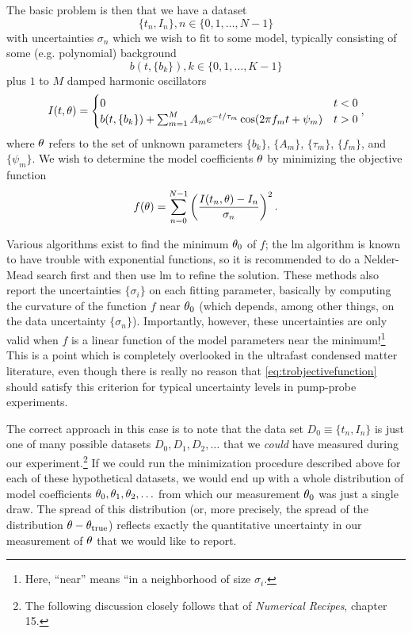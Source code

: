The basic problem is then that we have a dataset 
\begin{equation}
\{t_n, I_n\}, n\in \{0, 1, \ldots, N-1\}
\end{equation}
with uncertainties $\sigma_n$ which we wish to fit to some model, typically consisting of some (e.g. polynomial) background
\begin{equation}
b(t, \{b_k\}), k\in\{0, 1, \ldots, K-1\}
\end{equation}
plus $1$ to $M$ damped harmonic oscillators
\begin{equation}
I(t, \theta) = \begin{cases}
0 & t<0\\
b(t, \{b_k\})+\sum_{m=1}^M A_m e^{-t/\tau_m} \cos (2\pi f_m t + \psi_m) & t>0
\end{cases},
\end{equation}
where $\theta$ refers to the set of unknown parameters $\{b_k\}$, $\{A_m\}$, $\{\tau_m\}$, $\{f_m\}$, and $\{\psi_m\}$.
We wish to determine the model coefficients $\theta$ by minimizing the objective function
\begin{equation}\label{eq:trobjectivefunction}
f(\theta) = \sum_{n=0}^{N-1}\left(\frac{I(t_n, \theta)-I_n}{\sigma_n}\right)^2.
\end{equation}

Various algorithms exist to find the minimum $\theta_0$ of $f$; the \gls{lm} algorithm \citep{levenberg_method_1944,marquardt_algorithm_1963} is known to have trouble with exponential functions, so it is recommended to do a Nelder-Mead search \citep{nelder_simplex_1965} first and then use \gls{lm} to refine the solution.
These methods also report the uncertainties $\{\sigma_i\}$ on each fitting parameter, basically by computing the curvature of the function $f$ near $\theta_0$ (which depends, among other things, on the data uncertainty $\{\sigma_n\}$).
Importantly, however, these uncertainties are only valid when $f$ is a linear function of the model parameters near the minimum!\footnote{Here, ``near'' means ``in a neighborhood of size $\sigma_i$.}
This is a point which is completely overlooked in the ultrafast condensed matter literature, even though there is really no reason that \cref{eq:trobjectivefunction} should satisfy this criterion for typical uncertainty levels in pump-probe experiments.

The correct approach in this case is to note that the data set $D_0 \equiv \{t_n, I_n\}$ is just one of many possible datasets $D_0, D_1, D_2, \ldots$ that we \emph{could} have measured during our experiment.\footnote{The following discussion closely follows that of \textit{Numerical Recipes}, chapter 15\citep{numericalrecipes}.}
If we could run the minimization procedure described above for each of these hypothetical datasets, we would end up with a whole distribution of model coefficients $\theta_0, \theta_1, \theta_2, \ldots$ from which our measurement $\theta_0$ was just a single draw.
The spread of this distribution (or, more precisely, the spread of the distribution $\theta-\theta_\mathrm{true}$) reflects exactly the quantitative uncertainty in our measurement of $\theta$ that we would like to report.

